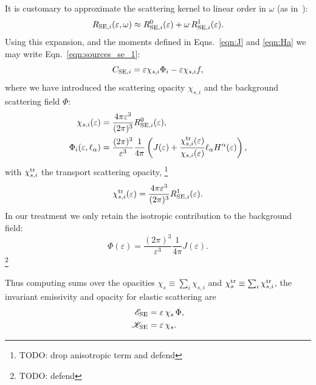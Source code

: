 \documentclass[aps,floatfix,prd,superscriptaddress,twocolumn]{revtex4-1}
\begin{document}
It is customary to approximate the scattering kernel to linear order in
$\omega$ (as in~\cite[Eqn.~4.21]{shib2011-truncated_moment}):
\begin{equation}
  \label{eqn:se_kernel_expansion}
  R_{{\rm SE},i}(\varepsilon,\omega) \approx
  R_{{\rm SE},i}^0(\varepsilon) + \omega \, R_{{\rm SE},i}^1(\varepsilon).
\end{equation}
Using this expansion, and the moments defined in Eqns.~\ref{eqn:J}
and \ref{eqn:Ha} we may write Eqn.~\ref{eqn:sources_se_1}:
\begin{equation}
  \label{eqn:sources_se_2}
  C_{{\rm SE},i}
  = \varepsilon \chi_{s,i} \Phi_i - \varepsilon \chi_{s,i} f,
\end{equation}
where we have introduced the scattering opacity $\chi_{s,i}$
and the background scattering field $\Phi$:
\begin{align}
  \label{eqn:opacity_s}
  \chi_{s,i}(\varepsilon)
  &= \frac{4\pi\varepsilon^3}{(2\pi)^3}R_{{\rm SE},i}^0(\varepsilon), \\
  \label{eqn:background_phi}
  \Phi_i(\varepsilon,\ell_\alpha)
  &= \frac{(2\pi)^3}{\varepsilon^3}\frac{1}{4\pi}
  \left(J(\varepsilon)+
  \frac{\chi^{\rm tr}_{s,i}(\varepsilon)}{\chi_{s,i}(\varepsilon)}
  \ell_\alpha H^\alpha(\varepsilon)\right),
\end{align}
with $\chi^{\rm tr}_{s,i}$ the transport scattering opacity,
\footnote{TODO: drop anisotropic term and defend}
\begin{equation}
  \label{eqn:opacity_s_tr}
  \chi^{\rm tr}_{s,i}(\varepsilon)
  = \frac{4\pi\varepsilon^3}{(2\pi)^3}R_{{\rm SE},i}^1(\varepsilon).
\end{equation}
In our treatment we only retain the isotropic contribution to the
background field:
\begin{equation}
  \Phi(\varepsilon)
  = \frac{(2\pi)^3}{\varepsilon^3}\frac{1}{4\pi}
  J(\varepsilon).
\end{equation}
\footnote{TODO: defend}

Thus computing sums over the opacities
$\chi_s\equiv\sum_i\chi_{s,i}$ and
$\chi^{\rm tr}_s\equiv\sum_i\chi^{\rm tr}_{s,i}$,
the invariant emissivity and opacity for elastic scattering are
\begin{align}
  \label{eqn:se_emissivity_summed}
  \mathscr{E}_{\rm SE}
  &= \varepsilon \, \chi_s \, \Phi, \\
  \label{eqn:se_opacity_summed}
  \mathscr{K}_{\rm SE}
  &= \varepsilon \, \chi_s.
\end{align}
\end{document}
